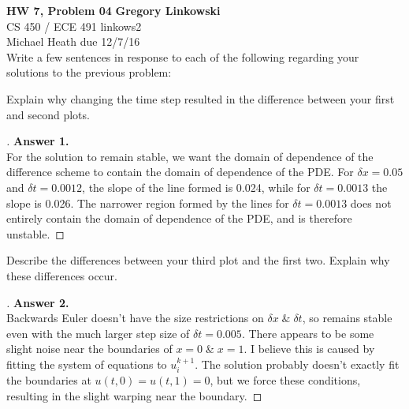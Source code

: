 \documentclass[12pt]{article}
\newenvironment{exercise}[2][Exercise]{\begin{trivlist}
\item[\hskip \labelsep {\bfseries #1}\hskip \labelsep {\bfseries #2.}]}{\end{trivlist}}
\begin{document}
\noindent
\large\textbf{HW 7, Problem 04} \hfill \textbf{Gregory Linkowski} \\
\normalsize CS 450 / ECE 491 \hfill linkows2 \\
Michael Heath \hfill due 12/7/16 \\


\vspace{5mm}
Write a few sentences in response to each of the following regarding your solutions to the previous problem:
\vspace{-2mm} \\

\vspace{5mm}
\begin{exercise}{1}
	Explain why changing the time step resulted in the difference between your first and second plots.
\end{exercise}%
\begin{proof}[]
	\textbf{Answer 1.} \\%
	For the solution to remain stable, we want the domain of dependence of the difference scheme to contain the domain of dependence of the PDE. For $\delta x = 0.05$ and $\delta t = 0.0012$, the slope of the line formed is 0.024, while for $\delta t = 0.0013$ the slope is 0.026. The narrower region formed by the lines for $\delta t = 0.0013$ does not entirely contain the domain of dependence of the PDE, and is therefore unstable. 
\end{proof}

\vspace{5mm}
\begin{exercise}{2}
	Describe the differences between your third plot and the first two. Explain why these differences occur.
\end{exercise}%
\begin{proof}[]
\textbf{Answer 2.} \\%
	Backwards Euler doesn't have the size restrictions on $\delta x \; \& \; \delta t$, so remains stable even with the much larger step size of $\delta t = 0.005$. There appears to be some slight noise near the boundaries of $x = 0 \; \& \; x = 1$. I believe this is caused by fitting the system of equations to $u_i^{k+1}$. The solution probably doesn't exactly fit the boundaries at $u(t,0) = u(t,1) = 0$, but we force these conditions, resulting in the slight warping near the boundary.
\end{proof}
\end{document}
